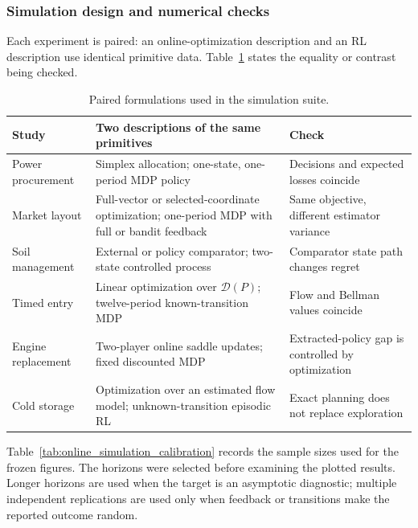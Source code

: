 \subsubsection{Simulation design and numerical checks}

Each experiment is paired: an online-optimization description and an RL description use identical primitive data. Table~\ref{tab:online_paired_studies} states the equality or contrast being checked.

\begin{table}[htbp]
\centering
\caption{Paired formulations used in the simulation suite.}
\label{tab:online_paired_studies}
\footnotesize
\begin{tabular}{@{}p{}p{}p{}@{}}
\toprule
Study & Two descriptions of the same primitives & Check \\
\midrule
Power procurement & Simplex allocation; one-state, one-period MDP policy & Decisions and expected losses coincide \\
Market layout & Full-vector or selected-coordinate optimization; one-period MDP with full or bandit feedback & Same objective, different estimator variance \\
Soil management & External or policy comparator; two-state controlled process & Comparator state path changes regret \\
Timed entry & Linear optimization over $\mathcal D(P)$; twelve-period known-transition MDP & Flow and Bellman values coincide \\
Engine replacement & Two-player online saddle updates; fixed discounted MDP & Extracted-policy gap is controlled by optimization \\
Cold storage & Optimization over an estimated flow model; unknown-transition episodic RL & Exact planning does not replace exploration \\
\bottomrule
\end{tabular}
\end{table}

Table~\ref{tab:online_simulation_calibration} records the sample sizes used for the frozen figures. The horizons were selected before examining the plotted results. Longer horizons are used when the target is an asymptotic diagnostic; multiple independent replications are used only when feedback or transitions make the reported outcome random.

